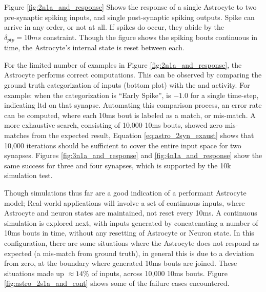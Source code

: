 Figure \ref{fig:2n1a_and_response} Shows the response of a single Astrocyte to
two pre-synaptic spiking inputs, and single post-synaptic spiking outputs. Spike
can arrive in any order, or not at all. If spikes do occur, they abide by the
$\delta_{ptp}=10ms$ constraint. Though the figure shows the spiking bouts
continuous in time, the Astrocyte's internal state is reset between each.


For the limited number of examples in Figure \ref{fig:2n1a_and_response}, the
Astrocyte performs correct computations. This can be observed by comparing the
ground truth categorization of inputs (bottom plot) with the \dser and \serca
activity. For example: when the categorization is ``Early Spike'', \dser is $-1.0$ for a
single time-step, indicating \Gls{ltd} on that synapse. Automating this comparison
process, an error rate can be computed, where each 10ms bout is labeled as a
match, or mis-match. A more exhaustive search, consisting
of 10,000 10ms bouts, showed zero mis-matches from the expected result, Equation
\ref{eq:astro_2syn_exaust} shows that 10,000 iterations should be sufficient to
cover the entire input space for two synapses. Figures
\ref{fig:3n1a_and_response} and \ref{fig:4n1a_and_response} show the same success
for three and four synapses, which is supported by the 10k simulation test.



Though simulations thus far are a good indication of a performant Astrocyte
model; Real-world applications will involve a set of continuous inputs, where
Astrocyte and neuron states are maintained, not reset every 10ms. A continuous
simulation is explored next, with inputs generated by concatenating a number of
10ms bouts in time, without any resetting of Astrocyte or Neuron state. In this
configuration, there are some situations where the Astrocyte does not respond as
expected (a mis-match from ground truth), in general this is due to a \ca
deviation from zero, at the boundary where generated 10ms bouts are
joined. These situations made up $\approx 14\%$ of inputs, across 10,000 10ms
bouts. Figure \ref{fig:astro_2s1a_and_cont} shows some of the failure cases
encountered.

